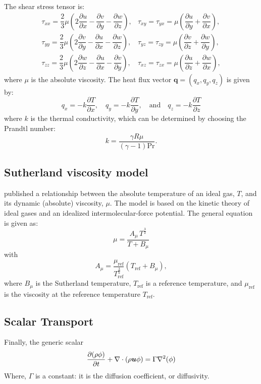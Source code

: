 \documentclass[10pt]{article}
\newcommand{\D}{\partial}
\newcommand{\diff}[2] {\dfrac{\partial #1}{\partial #2}}
\newcommand{\bv}[1]{\ensuremath{\mbox{\boldmath$ #1 $}}}
\begin{document}
The shear stress tensor is:
\begin{equation}
 \begin{array}{lll}
  \tau_{xx}= \dfrac{2}{3}  \mu \left( 2 \diff{u}{x} - \diff{v}{y} -\diff{w}{z} \right),
  &\tau_{xy}= \tau_{yx}=\mu \left( \diff{u}{y} + \diff{v}{x}\right),\\
  \tau_{yy}= \dfrac{2}{3}  \mu \left( 2 \diff{v}{y} - \diff{u}{x} -\diff{w}{z} \right),
  &\tau_{yz}= \tau_{zy}=\mu \left( \diff{v}{z} + \diff{w}{y}\right),\\
  \tau_{zz}= \dfrac{2}{3}  \mu \left( 2 \diff{w}{z} - \diff{u}{x} -\diff{v}{y} \right),
  &\tau_{xz}= \tau_{zx}=\mu \left( \diff{u}{z} + \diff{w}{x}\right),
 \end{array}
\end{equation}
where $\mu$ is the absolute viscosity. The heat flux vector $\mathbf{q}=(q_x,q_y,q_z)$ is given by:
\begin{equation}
 q_x = - k \diff{T}{x}, \quad q_y = - k \diff{T}{y}, \quad \mbox{and} \quad q_z = - k \diff{T}{z}
 \end{equation}
where $k$ is the thermal conductivity, which can be determined by choosing the Prandtl number:
$$k= \dfrac{\gamma R \mu}{ (\gamma-1) \text{Pr}}.$$

\subsection{Sutherland viscosity model}

\citet{Sutherland1893} published a relationship between the absolute temperature of an ideal gas, $T$,  and its dynamic (absolute) viscosity, $\mu$. The model is based on the kinetic theory of ideal gases and an idealized intermolecular-force potential. The general equation is given as:
\begin{equation}
\label{eq:Sutherland01}
 \mu  =\dfrac{A_\mu \, T^{\frac{3}{2}}}{T+B_\mu}
\end{equation}
with
$$    A_\mu = \dfrac{\mu_\text{ref}}{T_{\text{ref}}^{\frac{3}{2}}}(T_\text{ref} + B_\mu), $$
%
where $B_\mu$ is the Sutherland temperature, $T_{\text{ref}}$ is a reference temperature,  and $\mu_\text{ref}$ is the viscosity at the reference temperature $T_\text{ref}$.

\subsection{Scalar Transport}

Finally, the generic scalar 
\begin{equation}
  \frac{\D (\rho \phi)}{\D t} + \nabla\cdot\left(\rho\bv{u}\phi\right) = \Gamma \nabla^2 (\phi)
\end{equation}
Where, $\Gamma$ is a constant: it is the diffusion coefficient, or diffusivity. 
\end{document}
